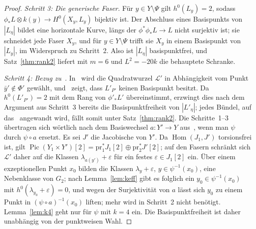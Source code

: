 \documentclass[11pt]{article}
\theoremstyle{definition}
\theoremstyle{remark}
\DeclareMathOperator{\Pic}{Pic}
\newcommand{\cL}{\mathcal{L}}
\begin{document}
\begin{proof}
\emph{Schritt 3: Die generische Faser.} Für $y\in Y\setminus\Psi$ gilt
$h^0(L_y)=2$, sodass $\phi_*L\otimes k(y)\to H^0(X_y,L_y)$ bijektiv ist. Der
Abschluss eines Basispunkts von $|L_\eta|$ bildet eine horizontale Kurve, längs
der $\phi^*\phi_*L\to L$ nicht surjektiv ist; sie schneidet jede Faser $X_y$, und
für $y\in Y\setminus\Psi$ trifft sie $X_y$ in einem Basispunkt von $|L_y|$, im
Widerspruch zu Schritt~2. Also ist $|L_\eta|$ basispunktfrei, und
Satz~\ref{thm:rank2} liefert mit $m=6$ und $L^2=-20k$ die behauptete Schranke.

\emph{Schritt 4: Bezug zu~\cite{So26}.} In~\cite[\S6.3.3]{So26} wird die
Quadratwurzel $\cL'$ in Abhängigkeit vom Punkt $\bar y'\notin\Phi'$ gewählt,
und~\cite[Lemma~3]{So26} zeigt, dass $L'_{P'}$ keinen Basispunkt besitzt. Da
$h^0(L'_{P'})=2$ mit dem Rang von $\phi'_*L'$ übereinstimmt, erzwingt dies nach
dem Argument aus Schritt~3 bereits die Basispunktfreiheit von $|L'_\eta|$; jedes
Bündel, auf das~\cite[(28)]{So26} angewandt wird, fällt somit unter
Satz~\ref{thm:rank2}. Die Schritte~1--3 übertragen sich wörtlich nach dem
Basiswechsel $a\colon Y'\to Y$ aus~\cite[\S6.3.1]{So26}, wenn man $\psi$ durch
$\psi\circ a$ ersetzt. Es sei $J'$ die Jacobische von $Y'$. Da
$\operatorname{Hom}(J_1,J')$ torsionsfrei ist, gilt
$\Pic(Y_1\times Y')[2]=\mathrm{pr}_1^*J_1[2]\oplus\mathrm{pr}_2^*J'[2]$; auf den
Fasern schränkt sich $\cL'$ daher auf die Klassen $\lambda_{a(y')}+\varepsilon$ für
ein festes $\varepsilon\in J_1[2]$ ein. Über einem exzeptionellen Punkt $x_0$ bilden
die Klassen $\lambda_y+\varepsilon$, $y\in\psi^{-1}(x_0)$, eine Nebenklasse von
$G_2$; nach Lemma~\ref{lem:keff} gibt es folglich ein $y_0\in\psi^{-1}(x_0)$ mit
$h^0(\lambda_{y_0}+\varepsilon)=0$, und wegen der Surjektivität von $a$ lässt sich
$y_0$ zu einem Punkt in $(\psi\circ a)^{-1}(x_0)$ liften; mehr wird in Schritt~2
nicht benötigt. Lemma~\ref{lem:k4} geht nur für $\psi$ mit $k=4$ ein. Die
Basispunktfreiheit ist daher unabhängig von der punktweisen Wahl.
\end{proof}
\end{document}
